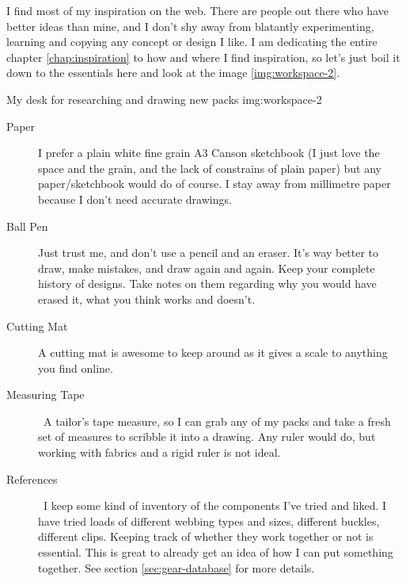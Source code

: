 I find most of my inspiration on the web. There are people out there who have better ideas than mine, and I don’t shy away from blatantly experimenting, learning and copying any concept or design I like. I am dedicating the entire chapter \ref{chap:inspiration} to how and where I find inspiration, so let’s just boil it down to the essentials here and look at the image \ref{img:workspace-2}.

{My desk for researching and drawing new packs}
{img:workspace-2}

\begin{description}

  \item[Paper] I prefer a plain white fine grain A3 Canson sketchbook (I just love the space and the grain, and the lack of constrains of plain paper) but any paper/sketchbook would do of course. I stay away from millimetre paper because I don’t need accurate drawings.

  \item [Ball Pen] Just trust me, and don’t use a pencil and an eraser. It’s way better to draw, make mistakes, and draw again and again. Keep your complete history of designs. Take notes on them regarding why you would have erased it, what you think works and doesn’t.

  \item [Cutting Mat] A cutting mat is awesome to keep around as it gives a scale to anything you find online.

  \item [Measuring Tape] A tailor’s tape measure, so I can grab any of my packs and take a fresh set of measures to scribble it into a drawing. Any ruler would do, but working with fabrics and a rigid ruler is not ideal.

  \item [References] I keep some kind of inventory of the components I’ve tried and liked. I have tried loads of different webbing types and sizes, different buckles, different clips. Keeping track of whether they work together or not is essential. This is great to already get an idea of how I can put something together. See section \ref{sec:gear-database} for more details.

\end{description}
